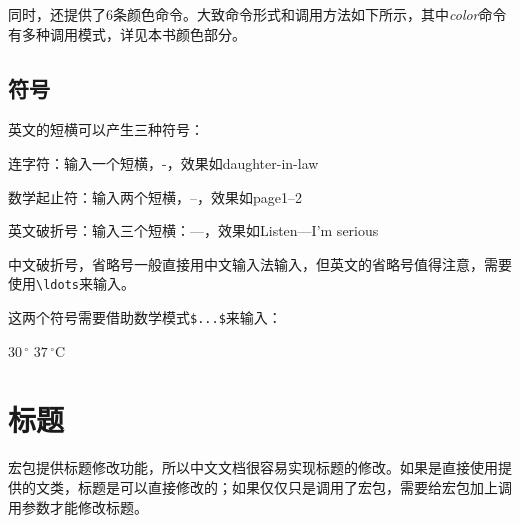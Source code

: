 \begin{latex}
\CJKunderdotbasesep
\CJKunderlinebasesep
\CJKunderdbllinebasesep
\CJKunderwavebasesep
\renewcommand{\CJKunderlinebasesep}{0.5em}
\end{latex}

同时，还提供了6条颜色命令。大致命令形式和调用方法如下所示，其中\emph{color}命令有多种调用模式，详见本书颜色部分。

\begin{latex}
\CJKunderlinecolor
\renewcommand{\CJKunderline}{\color{blue}}
\end{latex}

\subsection{符号}


英文的短横可以产生三种符号：\par

\begin{compactitem}[\textbullet]
	\item 连字符：输入一个短横，-，效果如daughter-in-law
	\item 数学起止符：输入两个短横，--，效果如page1--2
	\item 英文破折号：输入三个短横：---，效果如Listen---I'm serious
\end{compactitem}

中文破折号，省略号一般直接用中文输入法输入，但英文的省略号值得注意，需要使用\verb|\ldots|来输入。

这两个符号需要借助数学模式\verb|$...$|来输入：
\begin{codeshow}
	$30\,^{\circ}$
	$37\,^{\circ}\mathrm{C}$
\end{codeshow}

\section{标题}

\CTeX 宏包提供标题修改功能，所以中文文档很容易实现标题的修改。如果是直接使用\CTeX 提供的文类，标题是可以直接修改的；如果仅仅只是调用了\CTeX 宏包，需要给宏包加上调用参数才能修改标题。

\begin{latex}
\usepackage[
heading=true,%
]{ctex}
\end{latex}







